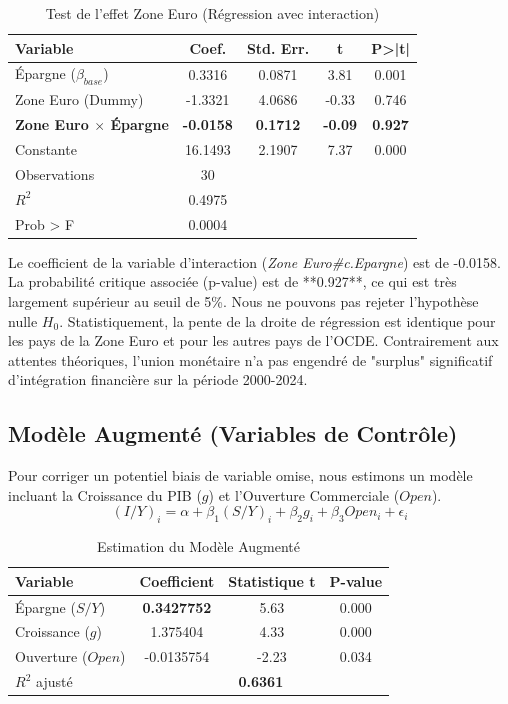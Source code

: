\documentclass[12pt, a4paper]{article}
\begin{document}
\begin{table}[H]
    \centering
    \caption{Test de l'effet Zone Euro (Régression avec interaction)}
    \label{tab:euro}
    \begin{tabular}{lcccc}
        \toprule
        \textbf{Variable} & \textbf{Coef.} & \textbf{Std. Err.} & \textbf{t} & \textbf{P>|t|} \\
        \midrule
        Épargne ($\beta_{base}$) & 0.3316 & 0.0871 & 3.81 & 0.001 \\
        Zone Euro (Dummy) & -1.3321 & 4.0686 & -0.33 & 0.746 \\
        \textbf{Zone Euro $\times$ Épargne} & \textbf{-0.0158} & \textbf{0.1712} & \textbf{-0.09} & \textbf{0.927} \\
        Constante & 16.1493 & 2.1907 & 7.37 & 0.000 \\
        \midrule
        Observations & 30 & & & \\
        $R^2$ & 0.4975 & & & \\
        Prob > F & 0.0004 & & & \\
        \bottomrule
    \end{tabular}
\end{table}


Le coefficient de la variable d'interaction (\textit{Zone Euro\#c.Epargne}) est de -0.0158. La probabilité critique associée (p-value) est de **0.927**, ce qui est très largement supérieur au seuil de 5\%.
Nous ne pouvons pas rejeter l'hypothèse nulle $H_0$. Statistiquement, la pente de la droite de régression est identique pour les pays de la Zone Euro et pour les autres pays de l'OCDE. Contrairement aux attentes théoriques, l'union monétaire n'a pas engendré de "surplus" significatif d'intégration financière sur la période 2000-2024.

\subsection{Modèle Augmenté (Variables de Contrôle)}

Pour corriger un potentiel biais de variable omise, nous estimons un modèle incluant la Croissance du PIB ($g$) et l'Ouverture Commerciale ($Open$).
$$ (I/Y)_i = \alpha + \beta_1(S/Y)_i + \beta_2 g_i + \beta_3 Open_i + \epsilon_i $$

\begin{table}[H]
    \centering
    \caption{Estimation du Modèle Augmenté}
    \begin{tabular}{lccc}
        \toprule
        \textbf{Variable} & \textbf{Coefficient} & \textbf{Statistique t} & \textbf{P-value} \\
        \midrule
        Épargne ($S/Y$) & \textbf{0.3427752} & 5.63 & 0.000 \\
        Croissance ($g$) & 1.375404 & 4.33 & 0.000 \\
        Ouverture ($Open$) & -0.0135754 & -2.23 & 0.034 \\
        \midrule
        $R^2$ ajusté & \multicolumn{3}{c}{\textbf{0.6361}} \\
        \bottomrule
    \end{tabular}
\end{table}
\end{document}
